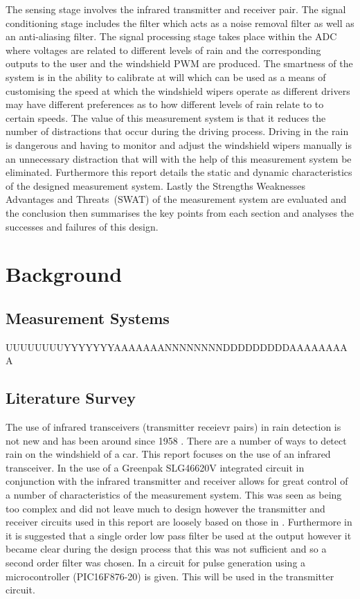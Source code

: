 \documentclass[conference, 11pt]{IEEEtran}
\begin{document}
The sensing stage involves the infrared transmitter and receiver pair. The signal conditioning stage includes the filter which acts as a noise removal filter as well as an anti-aliasing filter. The signal processing stage takes place within the ADC where voltages are related to different levels of rain and the corresponding outputs to the user and the windshield PWM are produced. The smartness of the system is in the ability to calibrate at will which can be used as a means of customising the speed at which the windshield wipers operate as different drivers may have different preferences as to how different levels of rain relate to to certain speeds. The value of this measurement system is that it reduces the number of distractions that occur during the driving process. Driving in the rain is dangerous and having to monitor and adjust the windshield wipers manually is an unnecessary distraction that will with the help of this measurement system be eliminated. Furthermore this report details the static and dynamic characteristics of the designed measurement system. Lastly the Strengths Weaknesses Advantages and Threats~(SWAT) of the measurement system are evaluated and the conclusion then summarises the key points from each section and analyses the successes and failures of this design. 

\section{Background}
	
	
	
\subsection{Measurement Systems}
UUUUUUUUYYYYYYYAAAAAAANNNNNNNNDDDDDDDDDAAAAAAAAA

	
\subsection{Literature Survey}
The use of infrared transceivers (transmitter receievr pairs) in rain detection is not new and has been around since 1958 \cite{SENS}. There are a number of ways to detect rain on the windshield of a car. This report focuses on the use of an infrared transceiver. In \cite{NOTE} the use of a Greenpak SLG46620V integrated circuit in conjunction with the infrared transmitter and receiver allows for great control of a number of characteristics of the measurement system. This was seen as being too complex and did not leave much to design however the transmitter and receiver circuits used in this report are loosely based on those in \cite{NOTE}. 
Furthermore in \cite{NOTE} it is suggested that a single order low pass filter be used at the output however it became clear during the design process that this was not sufficient and so a second order filter was chosen. In
\cite{PULSE} a circuit for pulse generation using a microcontroller (PIC16F876-20) is given. This will be used in the transmitter circuit. 
\end{document}
